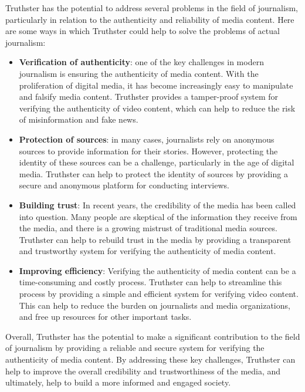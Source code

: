 \documentclass[target=mst,aauheader=]{thud}
\begin{document}
Truthster has the potential to address several problems in the field of journalism, particularly in relation to the authenticity and reliability of media content. Here are some ways in which Truthster could help to solve the problems of actual journalism:
\begin{itemize}

    \item \textbf{Verification of authenticity}: one of the key challenges in modern journalism is ensuring the authenticity of media content. With the proliferation of digital media, it has become increasingly easy to manipulate and falsify media content. Truthster provides a tamper-proof system for verifying the authenticity of video content, which can help to reduce the risk of misinformation and fake news.
    \item \textbf{Protection of sources}: in many cases, journalists rely on anonymous sources to provide information for their stories. However, protecting the identity of these sources can be a challenge, particularly in the age of digital media. Truthster can help to protect the identity of sources by providing a secure and anonymous platform for conducting interviews.
    \item \textbf{Building trust}: In recent years, the credibility of the media has been called into question. Many people are skeptical of the information they receive from the media, and there is a growing mistrust of traditional media sources. Truthster can help to rebuild trust in the media by providing a transparent and trustworthy system for verifying the authenticity of media content.
    \item \textbf{Improving efficiency}: Verifying the authenticity of media content can be a time-consuming and costly process. Truthster can help to streamline this process by providing a simple and efficient system for verifying video content. This can help to reduce the burden on journalists and media organizations, and free up resources for other important tasks.

\end{itemize}

Overall, Truthster has the potential to make a significant contribution to the field of journalism by providing a reliable and secure system for verifying the authenticity of media content. By addressing these key challenges, Truthster can help to improve the overall credibility and trustworthiness of the media, and ultimately, help to build a more informed and engaged society.
\end{document}
